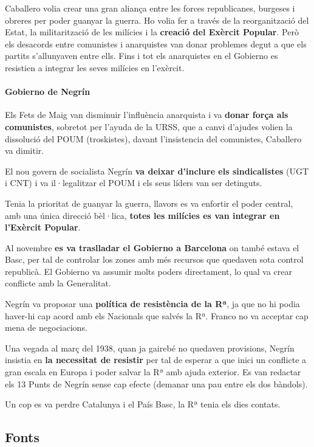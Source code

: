 \documentclass[arial,a4paper,print]{article}
\begin{document}
Caballero volia crear una gran aliança entre les forces republicanes, burgeses i obreres per poder guanyar la guerra. Ho volia fer a través de la reorganització del Estat, la militarització de les milícies i la \textbf{creació del Exèrcit Popular}. Però els desacords entre comunistes i anarquistes van donar problemes degut a que els partits s'allunyaven entre ells. Fins i tot els anarquistes en el Gobierno es resistien a integrar les seves milícies en l'exèrcit. 

\paragraph{Gobierno de Negrín}
Els Fets de Maig van disminuir l'influència anarquista i va \textbf{donar força als comunistes}, sobretot per l'ayuda de la URSS, que a canvi d'ajudes volien la dissolució del POUM (troskistes), davant l'insistencia del comunistes, Caballero va dimitir. 

El nou govern de socialista Negrín \textbf{va deixar d'inclure els sindicalistes} (UGT i CNT) i va il·legalitzar el POUM i els seus líders van ser detinguts. 

Tenia la prioritat de guanyar la guerra, llavors es va enfortir el poder central, amb una única direcció bèl·lica, \textbf{totes les milícies es van integrar en l'Exèrcit Popular}.  

Al novembre \textbf{es va traslladar el Gobierno a Barcelona} on també estava el Basc, per tal de controlar los zones amb més recursos que quedaven sota control republicà. El Gobierno va assumir molts poders directament, lo qual va crear conflicte amb la Generalitat. 

Negrín va proposar una \textbf{política de resistència de la Rª}, ja que no hi podia haver-hi cap acord amb els Nacionals que salvés la Rª. Franco no va acceptar cap mena de negociacions. 

Una vegada al març del 1938, quan ja gairebé no quedaven provisions, Negrín insistia en \textbf{la necessitat de resistir} per tal de esperar a que inici un conflicte a gran escala en Europa i poder salvar la Rª amb ajuda exterior. Es van redactar els 13 Punts de Negrín sense cap efecte (demanar una pau entre els dos bàndols). 

Un cop es va perdre Catalunya i el País Basc, la Rª tenia els dies contats. 


\subsection{Fonts}
\end{document}
